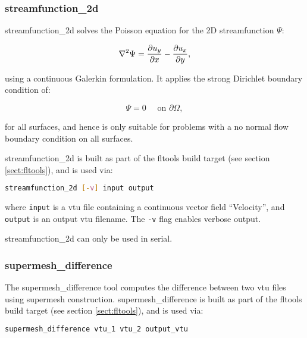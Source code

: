 
\subsubsection{streamfunction\_2d}
\label{sect:streamfunction_2d}

streamfunction\_2d solves the Poisson equation for the 2D streamfunction $\Psi$:

\begin{equation}
\nabla^2 \Psi = \ppx{u_y} - \ppx[y]{u_x},
\end{equation}

using a continuous Galerkin formulation. It applies the strong Dirichlet
boundary condition of:

\begin{equation}
\Psi = 0 \quad \text{ on } \partial \Omega,
\end{equation}

for all surfaces, and hence is only suitable for problems with a no normal flow boundary
condition on all surfaces.

streamfunction\_2d is built as part of the fltools build target (see section \ref{sect:fltools}),
and is used via:

\begin{lstlisting}[language = Bash]
streamfunction_2d [-v] input output
\end{lstlisting}

where \lstinline[language = Bash]+input+ is a vtu file containing a continuous vector
field ``Velocity'', and \lstinline[language = Bash]+output+ is an output vtu filename. The
\lstinline[language = Bash]+-v+ flag enables verbose output.

streamfunction\_2d can only be used in serial.


\subsubsection{supermesh\_difference}
\label{sect:supermesh_difference}

The supermesh\_difference tool computes the difference between two vtu
files using supermesh construction. supermesh\_difference is built as part of
the fltools build target (see section \ref{sect:fltools}), and is used via:

\begin{lstlisting}[language = Bash]
supermesh_difference vtu_1 vtu_2 output_vtu
\end{lstlisting}

